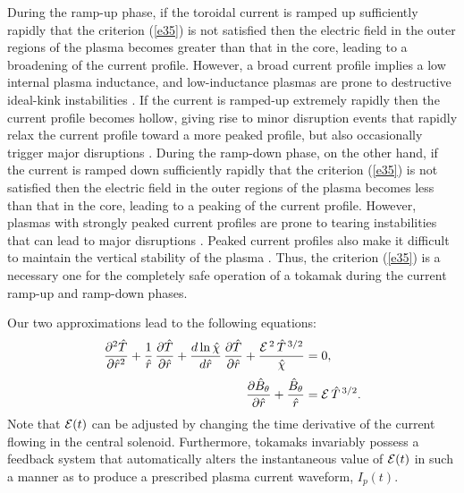 \documentclass{iopjournal}
\begin{document}
During the ramp-up phase, if the toroidal current is ramped up sufficiently rapidly that the criterion (\ref{e35}) is not satisfied then the electric field in the outer regions of the plasma becomes
greater than that in the core, leading to a broadening of the current profile. However, a broad current profile implies a low internal plasma inductance,
and low-inductance plasmas are prone to destructive ideal-kink instabilities \cite{wesson,cheng}.
If the current is ramped-up extremely rapidly then the current profile becomes hollow, giving rise to
minor disruption events that rapidly relax the current profile toward a  more peaked profile, but also occasionally trigger major disruptions \cite{granetz}.
During the ramp-down phase, on the other hand, if the current is ramped down sufficiently rapidly that the criterion (\ref{e35}) is not satisfied then the electric field in the outer regions of the plasma becomes
less than that in the core, leading to a peaking of the current profile. However, plasmas with strongly peaked current profiles are prone to tearing instabilities
that can lead to major disruptions \cite{wesson,cheng}. Peaked current profiles also make it difficult to maintain the vertical stability of the plasma \cite{mul}. Thus, the criterion (\ref{e35}) is a necessary one for  the completely safe operation of a tokamak during the
current ramp-up and ramp-down phases. 

Our two approximations lead to the following equations:
\begin{align}\label{e38}
\frac{\partial^2\hat{T}}{\partial \hat{r}^2} 
 +\frac{1}{\hat{r}}\,\frac{\partial\hat{T}}{\partial\hat{r}} + \frac{d\ln\hat{\chi}}{d\hat{r}}\,\frac{\partial\hat{T}}{\partial\hat{r}}
 + \frac{{\cal E}^{\,2}\,\hat{T}^{\,3/2}}{\hat{\chi}}&=0,\\[0.5ex]
 \frac{\partial\hat{B}_\theta}{\partial \hat{r}} + \frac{\hat{B}_\theta}{\hat{r}}&= {\cal E}\,\hat{T}^{\,3/2}.\label{e39}
\end{align}
Note that ${\cal E}(t)$ can be adjusted by changing the time derivative of the  current flowing in the central solenoid.  Furthermore, tokamaks
invariably  possess a feedback system that automatically alters the instantaneous value of ${\cal E}(t)$ in such a manner as to produce a prescribed plasma
current waveform, $I_p(t)$. 
\end{document}
